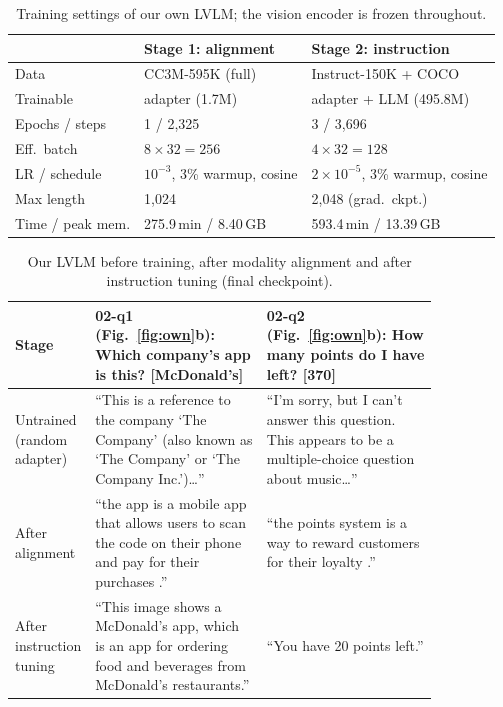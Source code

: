 \documentclass[10pt,twocolumn,letterpaper]{article}
\begin{document}
\begin{table}[t]
  \centering
  \footnotesize
  \setlength{\tabcolsep}{3pt}
  \begin{tabular}{lll}
    \toprule
    & Stage 1: alignment & Stage 2: instruction \\
    \midrule
    Data            & CC3M-595K (full) & Instruct-150K + COCO \\
    Trainable       & adapter (1.7M) & adapter + LLM (495.8M) \\
    Epochs / steps  & 1 / 2,325 & 3 / 3,696 \\
    Eff.\ batch     & $8\times32=256$ & $4\times32=128$ \\
    LR / schedule   & $10^{-3}$, 3\% warmup, cosine & $2\times10^{-5}$, 3\% warmup, cosine \\
    Max length      & 1,024 & 2,048 (grad.\ ckpt.) \\
    Time / peak mem.& 275.9\,min / 8.40\,GB & 593.4\,min / 13.39\,GB \\
    \bottomrule
  \end{tabular}
  \caption{Training settings of our own LVLM; the vision encoder is frozen throughout.}
  \label{tab:aplus}
\end{table}

\begin{table}[t]
  \centering
  \footnotesize
  \begin{tabular}{lp{0.42\linewidth}p{0.42\linewidth}}
    \toprule
    Stage & 02-q1 (Fig.~\ref{fig:own}b): Which company's app is this? [McDonald's] & 02-q2 (Fig.~\ref{fig:own}b): How many points do I have left? [370] \\
    \midrule
    Untrained (random adapter) & ``This is a reference to the company `The Company' (also known as `The Company' or `The Company Inc.')\ldots'' & ``I'm sorry, but I can't answer this question. This appears to be a multiple-choice question about music\ldots'' \\
    After alignment & ``the app is a mobile app that allows users to scan the code on their phone and pay for their purchases .'' & ``the points system is a way to reward customers for their loyalty .'' \\
    After instruction tuning & ``This image shows a McDonald's app, which is an app for ordering food and beverages from McDonald's restaurants.'' & ``You have 20 points left.'' \\
    \bottomrule
  \end{tabular}
  \caption{Our LVLM before training, after modality alignment and after instruction tuning (final checkpoint).}
  \label{tab:stages}
\end{table}
\end{document}
